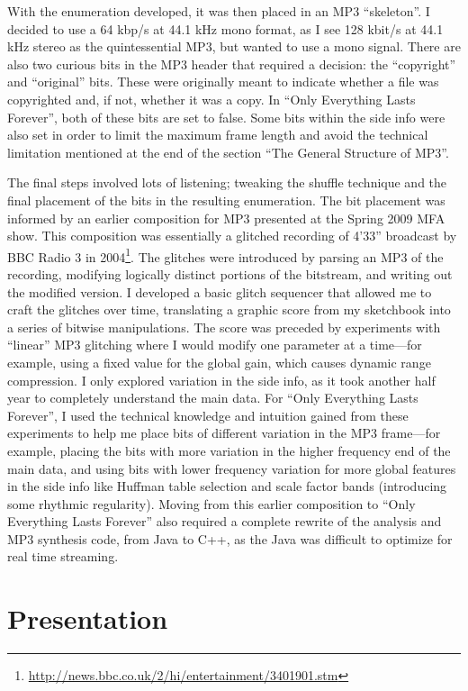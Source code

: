\documentclass{thesis}
\begin{document}
With the enumeration developed, it was then placed in an MP3 ``skeleton''. I decided to use a 64 kbp/s at 44.1 kHz mono format, as I see 128 kbit/s at 44.1 kHz stereo as the quintessential MP3, but wanted to use a mono signal. There are also two curious bits in the MP3 header that required a decision: the ``copyright'' and ``original'' bits. These were originally meant to indicate whether a file was copyrighted and, if not, whether it was a copy. In ``Only Everything Lasts Forever'', both of these bits are set to false. Some bits within the side info were also set in order to limit the maximum frame length and avoid the technical limitation mentioned at the end of the section ``The General Structure of MP3''.

The final steps involved lots of listening; tweaking the shuffle technique and the final placement of the bits in the resulting enumeration. The bit placement was informed by an earlier composition for MP3 presented at the Spring 2009 MFA show. This composition was essentially a glitched recording of 4'33'' broadcast by BBC Radio 3 in 2004\footnote{\url{http://news.bbc.co.uk/2/hi/entertainment/3401901.stm}}. The glitches were introduced by parsing an MP3 of the recording, modifying logically distinct portions of the bitstream, and writing out the modified version. I developed a basic glitch sequencer that allowed me to craft the glitches over time, translating a graphic score from my sketchbook into a series of bitwise manipulations. The score was preceded by experiments with ``linear'' MP3 glitching where I would modify one parameter at a time---for example, using a fixed value for the global gain, which causes dynamic range compression. I only explored variation in the side info, as it took another half year to completely understand the main data. For ``Only Everything Lasts Forever'', I used the technical knowledge and intuition gained from these experiments to help me place bits of different variation in the MP3 frame---for example, placing the bits with more variation in the higher frequency end of the main data, and using bits with lower frequency variation for more global features in the side info like Huffman table selection and scale factor bands (introducing some rhythmic regularity). Moving from this earlier composition to ``Only Everything Lasts Forever'' also required a complete rewrite of the analysis and MP3 synthesis code, from Java to C++, as the Java was difficult to optimize for real time streaming.

\section{Presentation}
\end{document}
